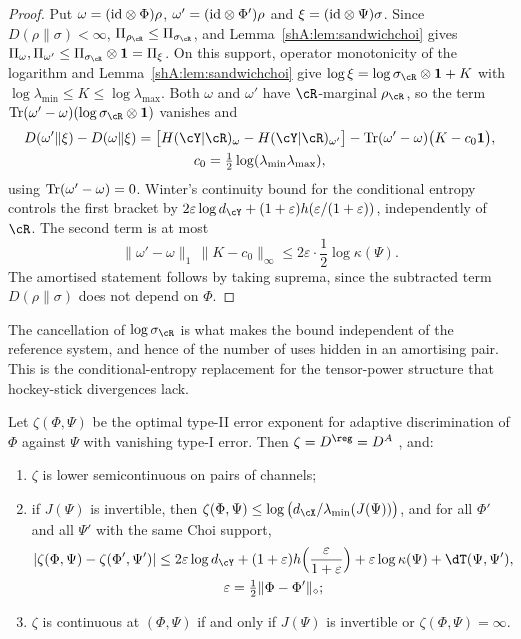 \begin{proof}
Put $\omega=(\mathrm{id}\otimes\Phi)\rho$, $\omega'=(\mathrm{id}\otimes\Phi')\rho$ and $\xi=(\mathrm{id}\otimes\Psi)\sigma$. Since $D(\rho\|\sigma)<\infty$, $\Pi_{\rho_\cR}\le\Pi_{\sigma_\cR}$, and Lemma~\ref{shA:lem:sandwichchoi} gives $\Pi_\omega,\Pi_{\omega'}\le\Pi_{\sigma_\cR}\otimes\mathbf 1=\Pi_\xi$. On this support, operator monotonicity of the logarithm and Lemma~\ref{shA:lem:sandwichchoi} give $\log\xi=\log\sigma_\cR\otimes\mathbf 1+K$ with $\log\lambda_{\min}\le K\le\log\lambda_{\max}$. Both $\omega$ and $\omega'$ have $\cR$-marginal $\rho_\cR$, so the term $\Tr(\omega'-\omega)(\log\sigma_\cR\otimes\mathbf 1)$ vanishes and
\begin{multline*}
D(\omega'\|\xi)-D(\omega\|\xi)=\big[H(\cY|\cR)_\omega-H(\cY|\cR)_{\omega'}\big]-\Tr(\omega'-\omega)\big(K-c_0\mathbf 1\big),\\
c_0=\tfrac12\log(\lambda_{\min}\lambda_{\max}),
\end{multline*}
using $\operatorname{Tr}(\omega'-\omega)=0$. Winter's continuity bound for the conditional entropy \cite{Winter2016} controls the first bracket by $2\varepsilon\log d_\cY+(1+\varepsilon)h(\varepsilon/(1+\varepsilon))$, independently of $\cR$. The second term is at most
\[
\|\omega'-\omega\|_1\,\|K-c_0\|_\infty\le2\varepsilon\cdot\frac12\log\kappa(\Psi).
\]
The amortised statement follows by taking suprema, since the subtracted term $D(\rho\|\sigma)$ does not depend on $\Phi$.
\end{proof}

The cancellation of $\log\sigma_\cR$ is what makes the bound independent of the reference system, and hence of the number of uses hidden in an amortising pair. This is the conditional-entropy replacement for the tensor-power structure that hockey-stick divergences lack.

\begin{corollary}\label{shA:cor:stein}
Let $\zeta(\Phi,\Psi)$ be the optimal type-II error exponent for adaptive discrimination of $\Phi$ against $\Psi$ with vanishing type-I error. Then $\zeta=D^\reg=D^A$ \cite{WangWilde2019,FFRS2020}, and:
\begin{enumerate}[label=(\alph*)]
\item $\zeta$ is lower semicontinuous on pairs of channels;
\item if $J(\Psi)$ is invertible, then $\zeta(\Phi,\Psi)\le\log\big(d_\cX/\lambda_{\min}(J(\Psi))\big)$, and for all $\Phi'$ and all $\Psi'$ with the same Choi support,
\begin{gather*}
|\zeta(\Phi,\Psi)-\zeta(\Phi',\Psi')|\le2\varepsilon\log d_\cY+(1+\varepsilon)h\Big(\frac{\varepsilon}{1+\varepsilon}\Big)+\varepsilon\log\kappa(\Psi)+\dT(\Psi,\Psi'),\\
\varepsilon=\tfrac12\|\Phi-\Phi'\|_\diamond;
\end{gather*}
\item $\zeta$ is continuous at $(\Phi,\Psi)$ if and only if $J(\Psi)$ is invertible or $\zeta(\Phi,\Psi)=\infty$.
\end{enumerate}
\end{corollary}

